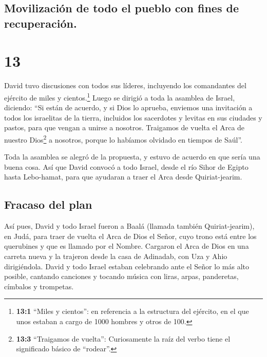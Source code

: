 \hypertarget{movilizaciuxf3n-de-todo-el-pueblo-con-fines-de-recuperaciuxf3n.}{%
\subsection{Movilización de todo el pueblo con fines de
recuperación.}\label{movilizaciuxf3n-de-todo-el-pueblo-con-fines-de-recuperaciuxf3n.}}

\hypertarget{section-12}{%
\section{13}\label{section-12}}

 David tuvo discusiones con todos sus líderes, incluyendo
los comandantes del ejército de miles y cientos.\footnote{\textbf{13:1}
  ``Miles y cientos'': en referencia a la estructura del ejército, en el
  que unos estaban a cargo de 1000 hombres y otros de 100.}
 Luego se dirigió a toda la asamblea de Israel, diciendo:
``Si están de acuerdo, y si Dios lo aprueba, enviemos una invitación a
todos los israelitas de la tierra, incluidos los sacerdotes y levitas en
sus ciudades y pastos, para que vengan a unirse a nosotros.
 Traigamos de vuelta el Arca de nuestro Dios\footnote{\textbf{13:3}
  ``Traigamos de vuelta'': Curiosamente la raíz del verbo tiene el
  significado básico de ``rodear''.} a nosotros, porque lo habíamos
olvidado en tiempos de Saúl''.

 Toda la asamblea se alegró de la propuesta, y estuvo de
acuerdo en que sería una buena cosa.  Así que David
convocó a todo Israel, desde el río Sihor de Egipto hasta Lebo-hamat,
para que ayudaran a traer el Arca desde Quiriat-jearim.

\hypertarget{fracaso-del-plan}{%
\subsection{Fracaso del plan}\label{fracaso-del-plan}}

 Así pues, David y todo Israel fueron a Baalá (llamada
también Quiriat-jearim), en Judá, para traer de vuelta el Arca de Dios
el Señor, cuyo trono está entre los querubines y que es llamado por el
Nombre.  Cargaron el Arca de Dios en una carreta nueva y
la trajeron desde la casa de Adinadab, con Uza y Ahio dirigiéndola.
 David y todo Israel estaban celebrando ante el Señor lo
más alto posible, cantando canciones y tocando música con liras, arpas,
panderetas, címbalos y trompetas.

